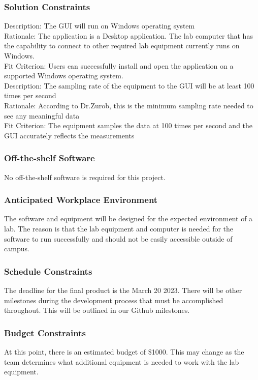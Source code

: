\documentclass[12pt, titlepage]{article}
\begin{document}
\subsubsection{Solution Constraints}

Description: The GUI will run on Windows operating system\\ 
Rationale: The application is a Desktop application. The lab computer that has the capability to connect to other required lab equipment currently runs on Windows.\\
Fit Criterion: Users can successfully install and open the application on a supported Windows operating system. \\

\noindent Description: The sampling rate of the equipment to the GUI will be at least 100 times per second\\ 
Rationale: According to Dr.Zurob, this is the minimum sampling rate needed to see any meaningful data\\
Fit Criterion: The equipment samples the data at 100 times per second and the GUI accurately reflects the measurements  \\

\subsubsection{Off-the-shelf Software}
No off-the-shelf software is required for this project. 

\subsubsection{Anticipated Workplace Environment}
The software and equipment will be designed for the expected environment of a lab. The reason is that the lab equipment and computer is needed for the software to run successfully and
should not be easily accessible outside of campus. 

\subsubsection{Schedule Constraints}
The deadline for the final product is the March 20 2023. There will be other milestones during the development process that must be accomplished throughout. 
This will be outlined in our Github milestones.


\subsubsection{Budget Constraints}
At this point, there is an estimated budget of \$1000. This may change as the team determines what additional equipment is needed to work with the lab equipment.
\end{document}
